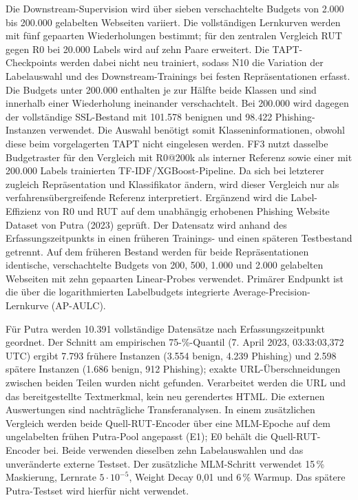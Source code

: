 Die Downstream-Supervision wird über sieben verschachtelte Budgets von 2.000 bis 200.000
gelabelten Webseiten variiert. Die vollständigen Lernkurven werden mit fünf gepaarten
Wiederholungen bestimmt; für den zentralen Vergleich RUT gegen R0 bei 20.000 Labels wird auf
zehn Paare erweitert. Die TAPT-Checkpoints werden dabei nicht neu trainiert, sodass N10 die
Variation der Labelauswahl und des Downstream-Trainings bei festen Repräsentationen erfasst.
Die Budgets unter 200.000 enthalten je zur Hälfte beide Klassen und sind innerhalb einer
Wiederholung ineinander verschachtelt. Bei 200.000 wird dagegen der vollständige SSL-Bestand
mit 101.578 benignen und 98.422 Phishing-Instanzen verwendet. Die Auswahl benötigt somit
Klasseninformationen, obwohl diese beim vorgelagerten TAPT nicht eingelesen werden. FF3 nutzt dasselbe Budgetraster für den Vergleich mit R0@200k als interner Referenz sowie einer
mit 200.000 Labels trainierten TF-IDF/XGBoost-Pipeline. Da sich bei letzterer zugleich
Repräsentation und Klassifikator ändern, wird dieser Vergleich nur als verfahrensübergreifende
Referenz interpretiert. Ergänzend wird die Label-Effizienz von R0 und RUT auf dem unabhängig
erhobenen Phishing Website Dataset von Putra (2023) geprüft. Der Datensatz wird anhand des
Erfassungszeitpunkts in einen früheren Trainings- und einen späteren Testbestand getrennt. Auf
dem früheren Bestand werden für beide Repräsentationen identische, verschachtelte Budgets von
200, 500, 1.000 und 2.000 gelabelten Webseiten mit zehn gepaarten Linear-Probes verwendet.
Primärer Endpunkt ist die über die logarithmierten Labelbudgets integrierte
Average-Precision-Lernkurve (AP-AULC).

Für Putra werden 10.391 vollständige Datensätze nach Erfassungszeitpunkt geordnet.
Der Schnitt am empirischen 75-\%-Quantil (7. April 2023, 03:33:03,372 UTC) ergibt
7.793 frühere Instanzen (3.554 benign, 4.239 Phishing) und 2.598 spätere Instanzen
(1.686 benign, 912 Phishing); exakte URL-Überschneidungen zwischen beiden Teilen
wurden nicht gefunden. Verarbeitet werden die URL und das bereitgestellte Textmerkmal,
kein neu gerendertes HTML. Die externen Auswertungen sind nachträgliche Transferanalysen.
In einem zusätzlichen Vergleich werden beide Quell-RUT-Encoder über eine MLM-Epoche
auf dem ungelabelten frühen Putra-Pool angepasst (E1); E0 behält die Quell-RUT-Encoder bei.
Beide verwenden dieselben zehn Labelauswahlen und das unveränderte externe Testset.
Der zusätzliche MLM-Schritt verwendet 15\,\% Maskierung, Lernrate $5\cdot10^{-5}$,
Weight Decay 0,01 und 6\,\% Warmup. Das spätere Putra-Testset wird hierfür nicht verwendet.

